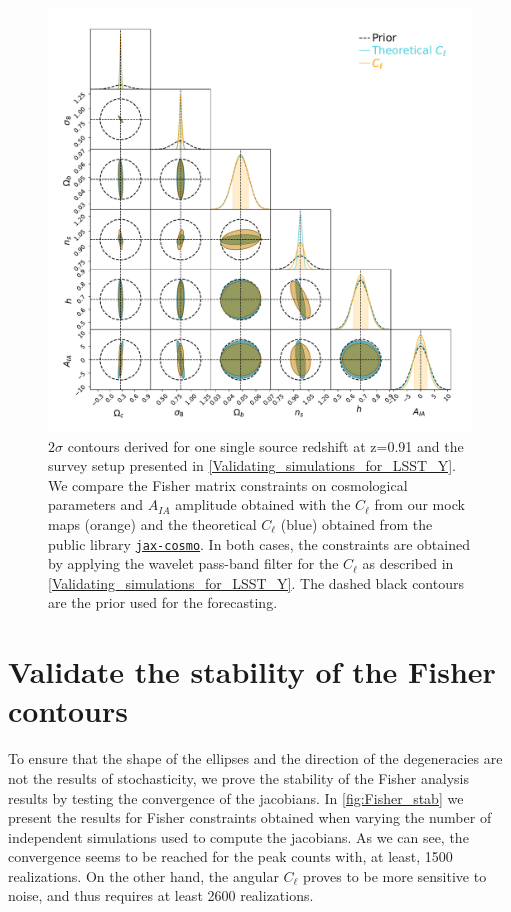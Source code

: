 \documentclass[twocolumn,twocolappendix]{aastex63}
\begin{document}
\renewcommand{\thefigure}{A\arabic{figure}}
\setcounter{figure}{0}
 \begin{figure}
    \centering
    \includegraphics[width=\textwidth]{paper/figures/Fisher_IA_theory_n.pdf}
    \caption{ $2\sigma$ contours derived for one single source redshift at z=0.91 and the survey setup presented in \autoref{Validating_simulations_for_LSST_Y}.
    We compare the Fisher matrix constraints on cosmological parameters and $A_{IA}$ amplitude obtained with the $C_{\ell}$ from our mock maps (orange) and the theoretical $C_{\ell}$ (blue) obtained from the public library  \href{https://github.com/DifferentiableUniverseInitiative/jax_cosmo}{\texttt{jax-cosmo}}.  
    In both cases, the constraints are obtained by applying  the wavelet pass-band filter for the $C_{\ell}$ as described in \autoref{Validating_simulations_for_LSST_Y}.
The dashed black contours are the prior used for the forecasting.}
     \label{fig:Fisher_result_theory}
\end{figure}


\section{Validate the stability of the Fisher contours}
To ensure that the shape of the ellipses and the direction of the degeneracies are not the results of stochasticity, we prove the stability of the Fisher analysis results by testing the convergence of the jacobians.
In \autoref{fig:Fisher_stab} we present the results for Fisher constraints obtained when varying the number of independent simulations used to compute the jacobians.  As we can see, the convergence seems to be reached for the peak counts with, at least, 1500 realizations. On the other hand, the angular $C_{\ell}$ proves to be more sensitive to noise, and thus requires at least 2600 realizations.
\end{document}
